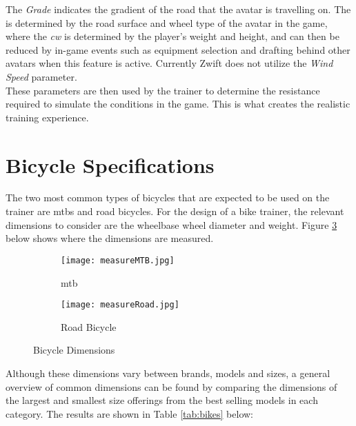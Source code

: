 The \textit{Grade} indicates the gradient of the road that the avatar is travelling on. The  is determined by the road surface and wheel type of the avatar in the game, where the \textit{\ac{cw}} is determined by the player's weight and height, and can then be reduced by in-game events such as equipment selection and drafting behind other avatars when this feature is active. Currently Zwift does not utilize the \textit{Wind Speed} parameter.\\
These parameters are then used by the trainer to determine the resistance required to simulate the conditions in the game. This is what creates the realistic training experience.

\newpage

\section{Bicycle Specifications}
The two most common types of bicycles that are expected to be used on the trainer are \acp{mtb} and road bicycles. For the design of a bike trainer, the relevant dimensions to consider are the wheelbase wheel diameter and weight. Figure \ref{fig:bikeDim} below shows where the dimensions are measured.

\begin{figure}[ht]
	\centering
	\begin{subfigure}{.5\textwidth}
		\centering
		\texttt{[image: measureMTB.jpg]}
		\caption{\ac{mtb} \citep[model by:][]{Pratama:2021}}
		\label{fig:sub1}
	\end{subfigure}%
	\begin{subfigure}{.5\textwidth}
		\centering
		\texttt{[image: measureRoad.jpg]}
		\caption{Road Bicycle \citep[model by:][]{Morozev:2017}}
		\label{fig:sub2}
	\end{subfigure}
	\caption{Bicycle Dimensions}
	\label{fig:bikeDim}
\end{figure}
Although these dimensions vary between brands, models and sizes, a general overview of common dimensions can be found by comparing the dimensions of the largest and smallest size offerings from the best selling models in each category. \citep{Lin:2021}The results are shown in Table \ref{tab:bikes} below: \citep{Geometry:2022}

